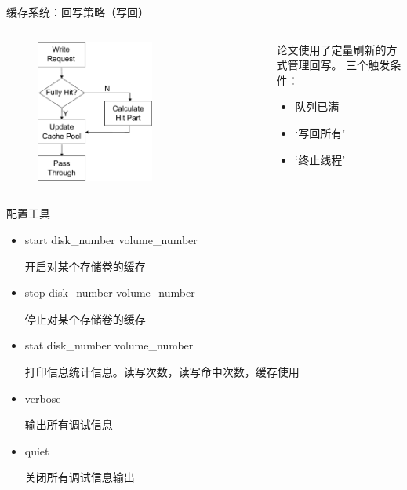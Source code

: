\documentclass[compress]{beamer}
\begin{document}
\begin{frame}{缓存系统：回写策略（写回）}
    \begin{columns}
    \begin{column}{0.5\textwidth}
        \begin{figure}
        \includegraphics[width=0.6\textwidth]{../graph/write-through}
        \end{figure}
    \end{column}
    \begin{column}{0.5\textwidth}
        论文使用了定量刷新的方式管理回写。
        三个触发条件：
        \begin{itemize}
        \item 队列已满
        \item ‘写回所有’
        \item ‘终止线程’
        \end{itemize}
    \end{column}
    \end{columns}
\end{frame}

\begin{frame}{配置工具}
\begin{itemize}

\item start   disk\_number   volume\_number

开启对某个存储卷的缓存

\item stop   disk\_number   volume\_number

停止对某个存储卷的缓存

\item stat   disk\_number   volume\_number

打印信息统计信息。读写次数，读写命中次数，缓存使用

\item verbose

输出所有调试信息

\item quiet

关闭所有调试信息输出

\end{itemize}
\end{frame}
\end{document}
